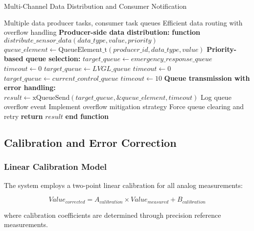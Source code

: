 \documentclass{article}
\begin{document}
\begin{algorithm}
\caption{Multi-Channel Data Distribution and Consumer Notification}
\label{alg:data_distribution_system}
\begin{algorithmic}[1]
\REQUIRE Multiple data producer tasks, consumer task queues
\ENSURE Efficient data routing with overflow handling
\STATE \textbf{Producer-side data distribution:}
\STATE \textbf{function} $distribute\_sensor\_data(data\_type, value, priority)$
\STATE $queue\_element \leftarrow \text{QueueElement\_t}(producer\_id, data\_type, value)$
\STATE
\STATE \textbf{Priority-based queue selection:}
    \STATE $target\_queue \leftarrow emergency\_response\_queue$
    \STATE $timeout \leftarrow 0$ 
    \STATE $target\_queue \leftarrow LVGL\_queue$
    \STATE $timeout \leftarrow 0$ 
    \STATE $target\_queue \leftarrow current\_control\_queue$
    \STATE $timeout \leftarrow 10$ 
\ENDIF
\STATE
\STATE \textbf{Queue transmission with error handling:}
\STATE $result \leftarrow \text{xQueueSend}(target\_queue, \&queue\_element, timeout)$
    \STATE Log queue overflow event
    \STATE Implement overflow mitigation strategy
        \STATE Force queue clearing and retry
    \ENDIF
\ENDIF
\STATE \textbf{return} $result$
\STATE \textbf{end function}
\end{algorithmic}
\end{algorithm}

\subsection{Calibration and Error Correction}

\subsubsection{Linear Calibration Model}

The system employs a two-point linear calibration for all analog measurements:

\begin{equation}
Value_{corrected} = A_{calibration} \times Value_{measured} + B_{calibration}
\end{equation}

where calibration coefficients are determined through precision reference measurements.
\end{document}
